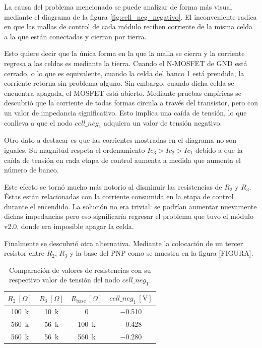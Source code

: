 La causa del problema mencionado se puede analizar de forma más visual mediante el diagrama de la figura \ref{fig:cell_neg_negativo}. El inconveniente radica en que las mallas de control de cada módulo reciben corriente de la misma celda a la que están conectadas y cierran por tierra. 

Esto quiere decir que la única forma en la que la malla se cierra y la corriente regresa a las celdas es mediante la tierra. Cuando el N-MOSFET de GND está cerrado, o lo que es equivalente, cuando la celda del banco 1 está prendida, la corriente retorna sin problema alguno. Sin embargo, cuando dicha celda se encuentra apagada, el MOSFET está abierto. Mediante pruebas empíricas se descubrió que la corriente de todas formas circula a través del transistor, pero con un valor de impedancia significativo. Esto implica una caída de tensión, lo que conlleva a que el nodo $cell\_neg_1$ adquiera un valor de tensión negativo.

Otro dato a destacar es que las corrientes mostradas en el diagrama no son iguales. Su magnitud respeta el ordenamiento $Ic_3 > Ic_2 > Ic_1$ debido a que la caída de tensión en cada etapa de control aumenta a medida que aumenta el número de banco.

Este efecto se tornó mucho más notorio al disminuir las resistencias de $R_2$ y $R_3$. Éstas están relacionadas con la corriente consumida en la etapa de control durante el encendido. La solución no era trivial: se podrían aumentar nuevamente dichas impedancias pero eso significaría regresar el problema que tuvo el módulo v2.0, donde era imposible apagar la celda.

Finalmente se descubrió otra alternativa. Mediante la colocación de un tercer resistor entre $R_2$, $R_3$ y la base del PNP como se muestra en la figura [FIGURA].


\begin{table}[H]
\centering
\begin{tabular}{@{}cccc@{}}
\toprule
$R_2\ [\Omega]$ & $R_3\ [\Omega]$ & $R_{\text{base}}\ [\Omega]$ & $cell\_neg_1\ [\text{V}]$ \\ \midrule
\SI{100}{k}     & \SI{10}{k}      & 0                           & \SI{-0.510}{} \\
\SI{560}{k}     & \SI{56}{k}      & \SI{100}{k}                 & \SI{-0.428}{} \\
\SI{560}{k}     & \SI{56}{k}      & \SI{560}{k}                 & \SI{-0.280}{} \\ \bottomrule
\end{tabular}
\caption{Comparación de valores de resistencias con su respectivo valor de tensión del nodo $cell\_neg_1$.}
\label{tab:cell_neg}
\end{table}

